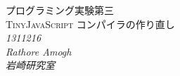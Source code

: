\begin{titlepage}
   \begin{center}
      \textsc{\Huge プログラミング実験第三}\\ [1cm]
      \textsc{\Huge TinyJavaScript コンパイラの作り直し}\\ [2cm]
      \large\textit{\huge 1311216}\\
      \large\textit{\huge Rathore Amogh\\}
      \large\textit{\huge 岩崎研究室\\}
   \end{center}
\end{titlepage}
